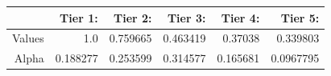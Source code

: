 \begin{tabular}{rrrrrr}
  \hline
   & \textbf{  Tier 1: } & \textbf{  Tier 2:} & \textbf{  Tier 3:} & \textbf{  Tier 4:} & \textbf{  Tier 5:} \\\hline
  Values & 1.0 & 0.759665 & 0.463419 & 0.37038 & 0.339803 \\
  Alpha & 0.188277 & 0.253599 & 0.314577 & 0.165681 & 0.0967795 \\\hline
\end{tabular}
